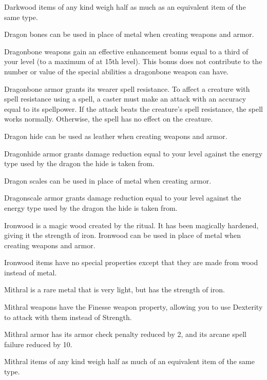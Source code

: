 Darkwood items of any kind weigh half as much as an equivalent item of the same type.


Dragon bones can be used in place of metal when creating weapons and armor.

Dragonbone weapons gain an effective enhancement bonus equal to a third of your level (to a maximum of  at 15th level).
This bonus does not contribute to the number or value of the special abilities a dragonbone weapon can have.

Dragonbone armor grants its wearer spell resistance.
To affect a creature with spell resistance using a spell, a caster must make an attack with an accuracy equal to its spellpower.
If the attack beats the creature's spell resistance, the spell works normally.
Otherwise, the spell has no effect on the creature.


Dragon hide can be used as leather when creating weapons and armor.

Dragonhide armor grants damage reduction equal to your level against the energy type used by the dragon the hide is taken from.


Dragon scales can be used in place of metal when creating armor.

Dragonscale armor grants damage reduction equal to your level against the energy type used by the dragon the hide is taken from.

Ironwood is a magic wood created by the  ritual.
It has been magically hardened, giving it the strength of iron.
Ironwood can be used in place of metal when creating weapons and armor.

Ironwood items have no special properties except that they are made from wood instead of metal.

Mithral is a rare metal that is very light, but has the strength of iron.

Mithral weapons have the Finesse weapon property, allowing you to use Dexterity to attack with them instead of Strength.

Mithral armor has its armor check penalty reduced by 2, and its arcane spell failure reduced by 10.

Mithral items of any kind weigh half as much of an equivalent item of the same type.


